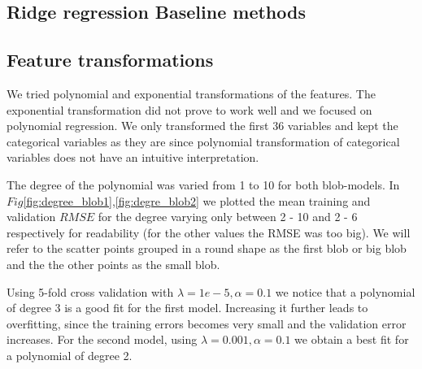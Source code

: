 \documentclass{article} %
\begin{document}
\subsection{Ridge regression Baseline methods}
 

\subsection{Feature transformations}
We tried polynomial and exponential transformations of the features.
The exponential transformation did not prove to work well and we focused on polynomial regression.
We only transformed the first 36 variables and kept the categorical variables as they are since  polynomial transformation of categorical variables does not have an intuitive interpretation. 

The degree of the polynomial was varied from 1 to 10 for both blob-models. In $Fig$\ref{fig:degree_blob1},\ref{fig:degre_blob2} we plotted the mean training and validation $RMSE$ for the degree varying only between 2 - 10 and 2 - 6 respectively for readability (for the other values the RMSE was too big). We will refer to the scatter points grouped in a round shape as the first blob or big blob and the the other points as the small blob.

Using 5-fold cross validation with $\lambda = 1e-5, \alpha = 0.1$ we
notice that a polynomial of degree 3 is a good fit for the first model. Increasing it further leads to overfitting, since the training errors becomes very small and the validation error increases. For the second model, using  $\lambda = 0.001, \alpha = 0.1$ we obtain a best fit for a polynomial of degree 2.
\end{document}
